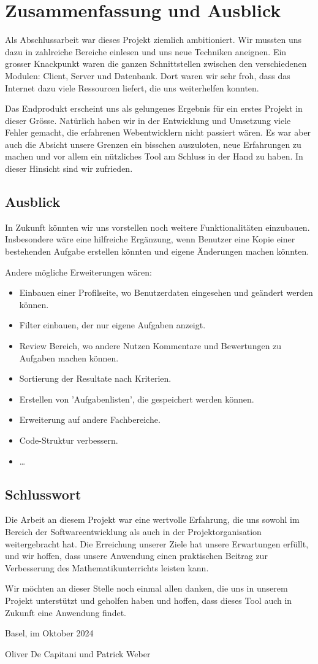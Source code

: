 \section{Zusammenfassung und Ausblick}
Als Abschlussarbeit war dieses Projekt ziemlich ambitioniert. Wir mussten uns dazu in zahlreiche Bereiche einlesen und uns neue Techniken aneignen. Ein grosser Knackpunkt waren die ganzen Schnittstellen zwischen den verschiedenen Modulen: Client, Server und Datenbank. Dort waren wir sehr froh, dass das Internet dazu viele Ressourcen liefert, die uns weiterhelfen konnten. 

Das Endprodukt erscheint uns als gelungenes Ergebnis für ein erstes Projekt in dieser Grösse. Natürlich haben wir in der Entwicklung und Umsetzung viele Fehler gemacht, die erfahrenen Webentwicklern nicht passiert wären. Es war aber auch die Absicht unsere Grenzen ein bisschen auszuloten, neue Erfahrungen zu machen und vor allem ein nützliches Tool am Schluss in der Hand zu haben. In dieser Hinsicht sind wir zufrieden.


\subsection{Ausblick}
In Zukunft könnten wir uns vorstellen noch weitere Funktionalitäten einzubauen. Insbesondere wäre eine hilfreiche Ergänzung, wenn Benutzer eine Kopie einer bestehenden Aufgabe erstellen könnten und eigene Änderungen machen könnten.

Andere mögliche Erweiterungen wären:
\begin{itemize}
    \item Einbauen einer Profilseite, wo Benutzerdaten eingesehen und geändert werden können. 
    \item Filter einbauen, der nur eigene Aufgaben anzeigt.
    \item Review Bereich, wo andere Nutzen Kommentare und Bewertungen zu Aufgaben machen können.
    \item Sortierung der Resultate nach Kriterien.
    \item Erstellen von 'Aufgabenlisten', die gespeichert werden können.
    \item Erweiterung auf andere Fachbereiche.
    \item Code-Struktur verbessern.
    \item \ldots
\end{itemize}


\subsection{Schlusswort}
Die Arbeit an diesem Projekt war eine wertvolle Erfahrung, die uns sowohl im Bereich der Softwareentwicklung als auch in der Projektorganisation weitergebracht hat. Die Erreichung unserer Ziele hat unsere Erwartungen erfüllt, und wir hoffen, dass unsere Anwendung einen praktischen Beitrag zur Verbesserung des Mathematikunterrichts leisten kann.

Wir möchten an dieser Stelle noch einmal allen danken, die uns in unserem Projekt unterstützt und geholfen haben und hoffen, dass dieses Tool auch in Zukunft eine Anwendung findet.


\begin{flushright}
    Basel, im Oktober 2024
    
    Oliver De Capitani und Patrick Weber
\end{flushright}
